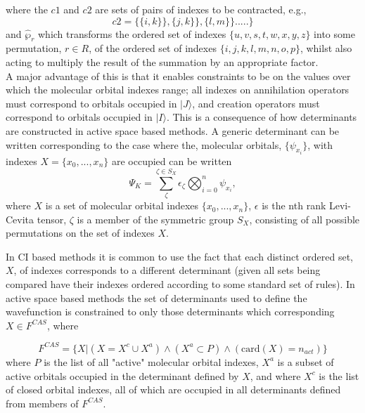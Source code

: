 where the $c1$ and $c2$ are sets of pairs of indexes to be contracted, e.g.,
\begin{equation}
c2 = \{ \{i, k\} \} , \{j, k\} \} ,\{l, m\} \}.....\} 
\end{equation}
and $\hat{\wp}_{r}$ which transforms the ordered set of indexes
$\{u,v,s,t,w,x,y,z\}$ into some permutation, $r\in R$, of the ordered set of
indexes $\{i,j,k,l,m,n,o,p\}$, whilst also acting to multiply the result of the
summation by an appropriate factor.\\

\noindent A major advantage of this is that it enables constraints to be
on the values over which the molecular orbital indexes range; all indexes on 
annihilation operators must correspond to orbitals occupied in $|J\rangle$, and 
creation operators must correspond to orbitals occupied in $|I\rangle$. 
This is a consequence of how determinants are constructed in 
active space based methods. A generic determinant can be written 
corresponding to the case where the, molecular orbitals, $\{\psi_{x_{i}}\}$,
with indexes  $X = \{x_{0},...,x_{n}\}$ are occupied can be written
\begin{equation}
\Psi_{K} = \sum^{\zeta \in S_{X}}_{\zeta} \epsilon_{\zeta} \bigotimes_{i=0}^{n}  \psi_{x_{i}},
\end{equation}
where $X$ is a set of molecular orbital indexes $\{x_{0},...,x_{n}\}$,
$\epsilon$ is the nth rank Levi-Cevita
tensor, $\zeta$ is a member of the symmetric group $S_{X}$,
consisting of all possible permutations on the set of indexes $X$.

\noindent In CI based methods it is common to use the fact that 
each distinct ordered set, $X$, of indexes corresponds to a different 
determinant (given all sets being compared have their indexes ordered according
to some standard set of rules). In active space based methods the set of
determinants used to define the wavefunction is constrained to only
those determinants which corresponding $X \in {F^{CAS}}$, where

\begin{equation*}
F^{CAS} = \{ X | (X = X^{c} \cup X^{a}) \wedge (X^{a} \subset P) \wedge ( \text{card}(X) = n_{act} )  \}
\end{equation*}
where $P$ is the list of all "active" molecular orbital indexes, 
$X^{a}$ is a subset of active orbitals occupied in the determinant defined by $X$, and
where $X^{c}$ is the list of closed orbital indexes, all of which are occupied in all determinants defined
from members of $F^{CAS}$.\\

